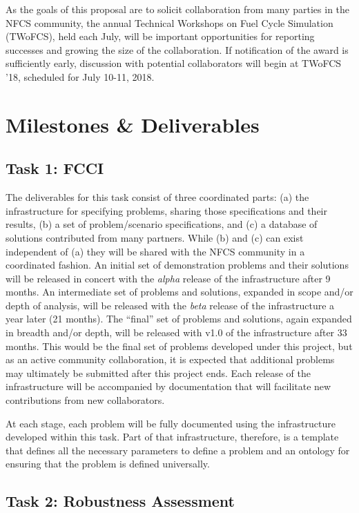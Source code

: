 As the goals of this proposal are to solicit collaboration from many parties
in the \gls{NFCS} community, the annual Technical Workshops on Fuel Cycle
Simulation (TWoFCS), held each July, will be important opportunities for
reporting successes and growing the size of the collaboration.  If
notification of the award is sufficiently early, discussion with potential
collaborators will begin at TWoFCS '18, scheduled for July 10-11, 2018.

\section{Milestones \& Deliverables}

\subsection{Task 1: \gls{FCCI}}

The deliverables for this task consist of three coordinated parts: (a) the
infrastructure for specifying problems, sharing those specifications and their
results, (b) a set of problem/scenario specifications, and (c) a database of
solutions contributed from many partners.  While (b) and (c) can exist
independent of (a) they will be shared with the \gls{NFCS} community in a
coordinated fashion.  An initial set of demonstration problems and their
solutions will be released in concert with the \emph{alpha} release of the
infrastructure after 9 months.  An intermediate set of problems and solutions,
expanded in scope and/or depth of analysis, will be released with the
\emph{beta} release of the infrastructure a year later (21 months).  The
``final'' set of problems and solutions, again expanded in breadth and/or
depth, will be released with v1.0 of the infrastructure after 33 months.  This
would be the final set of problems developed under this project, but as an
active community collaboration, it is expected that additional problems may
ultimately be submitted after this project ends. Each release of the
infrastructure will be accompanied by documentation that will facilitate new
contributions from new collaborators.

At each stage, each problem will be fully documented using the infrastructure
developed within this task.  Part of that infrastructure, therefore, is a
template that defines all the necessary parameters to define a problem and an
ontology for ensuring that the problem is defined universally.

\subsection{Task 2: Robustness Assessment}

